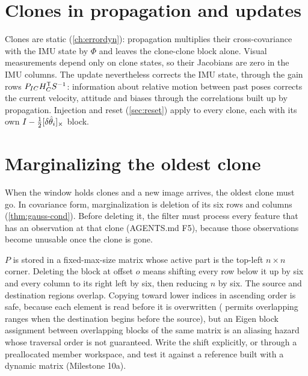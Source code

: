 \section{Clones in propagation and updates}

Clones are static (\cref{ch:errordyn}): propagation multiplies their cross-covariance with the IMU state by $\Phi$ and leaves the
clone-clone block alone. Visual measurements depend only on clone states, so their Jacobians are zero in the IMU columns.
The update nevertheless corrects the IMU state, through the gain rows $P_{IC}H_C^{\mathsf{T}} S^{-1}$: information about relative motion
between past poses corrects the current velocity, attitude and biases through the correlations built up by propagation.
Injection and reset (\cref{sec:reset}) apply to every clone, each with its own $I - \tfrac12[\delta\hat\theta_i]_{\times}$ block.

\section{Marginalizing the oldest clone}

When the window holds  clones and a new image arrives, the oldest clone must go. In covariance form,
marginalization is deletion of its six rows and columns (\cref{thm:gauss-cond}). Before deleting it, the filter must process
every feature that has an observation at that clone (AGENTS.md F5), because those observations become unusable once
the clone is gone.

\begin{implnote}
$P$ is stored in a fixed-max-size matrix whose active part is the top-left $n\times n$ corner. Deleting the block at offset $o$
means shifting every row below it up by six and every column to its right left by six, then reducing $n$ by six. The source
and destination regions overlap. Copying toward lower indices in ascending order is safe, because each element is read
before it is overwritten ( permits overlapping ranges when the destination begins before the source), but an
Eigen block assignment between overlapping blocks of the same matrix is an aliasing hazard whose traversal order is not
guaranteed. Write the shift explicitly, or through a preallocated member workspace, and test it against a reference built
with a dynamic matrix (Milestone 10a).
\end{implnote}

